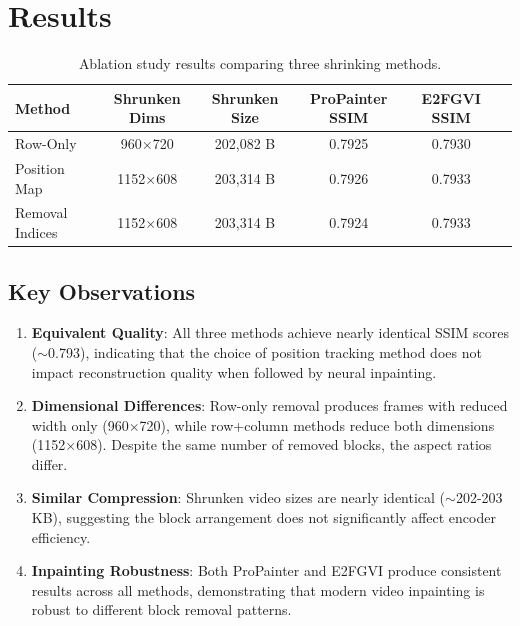 \documentclass[11pt,a4paper]{article}
\begin{document}
\section{Results}

\begin{table}[h]
\centering
\begin{tabular}{lccccc}
\toprule
\textbf{Method} & \textbf{Shrunken Dims} & \textbf{Shrunken Size} & \textbf{ProPainter SSIM} & \textbf{E2FGVI SSIM} \\
\midrule
Row-Only & 960$\times$720 & 202,082 B & 0.7925 & 0.7930 \\
Position Map & 1152$\times$608 & 203,314 B & 0.7926 & 0.7933 \\
Removal Indices & 1152$\times$608 & 203,314 B & 0.7924 & 0.7933 \\
\bottomrule
\end{tabular}
\caption{Ablation study results comparing three shrinking methods.}
\label{tab:results}
\end{table}

\subsection{Key Observations}

\begin{enumerate}
    \item \textbf{Equivalent Quality}: All three methods achieve nearly identical SSIM scores ($\sim$0.793), indicating that the choice of position tracking method does not impact reconstruction quality when followed by neural inpainting.
    
    \item \textbf{Dimensional Differences}: Row-only removal produces frames with reduced width only (960$\times$720), while row+column methods reduce both dimensions (1152$\times$608). Despite the same number of removed blocks, the aspect ratios differ.
    
    \item \textbf{Similar Compression}: Shrunken video sizes are nearly identical ($\sim$202-203 KB), suggesting the block arrangement does not significantly affect encoder efficiency.
    
    \item \textbf{Inpainting Robustness}: Both ProPainter and E2FGVI produce consistent results across all methods, demonstrating that modern video inpainting is robust to different block removal patterns.
\end{enumerate}
\end{document}
